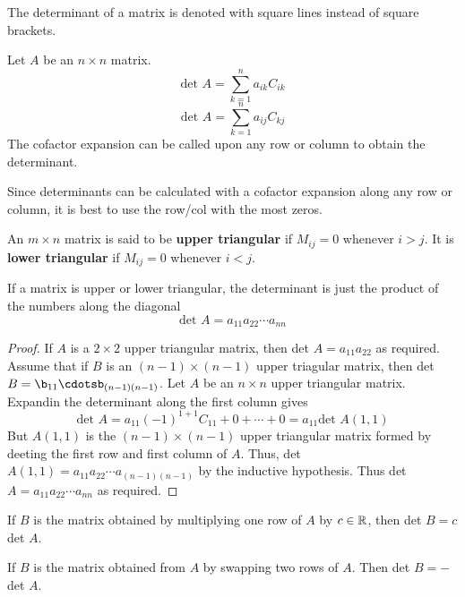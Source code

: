 \documentclass[english, 12pt]{article}
\begin{document}
\begin{note}
The determinant of a matrix is denoted with square lines instead of square brackets.
\end{note}

\begin{thrm}
Let $A$ be an $n \times n$ matrix.
\[\text{det }A = \sum_{k=1}^n a_{ik}C_{ik}\]
\[\text{det }A = \sum_{k=1}^n a_{ij}C_{kj}\]
The cofactor expansion can be called upon any row or column to obtain the determinant.
\end{thrm}

\begin{note}
Since determinants can be calculated with a cofactor expansion along any row or column, it is best to use the row/col with the most zeros.
\end{note}

\begin{defn}
An $m \times n$ matrix is said to be \textbf{upper triangular} if  $M_{ij} = 0$ whenever $i > j$. It is \textbf{lower triangular} if $M_{ij} = 0$ whenever $ i < j$.
\end{defn}

\begin{thrm}
If a matrix is upper or lower triangular, the determinant is just the product of the numbers along the diagonal
\[\text{det }A = a_{11}a_{22}\cdots a_{nn}\]
\begin{proof}
If $A$ is a $2 \times 2$ upper triangular matrix, then det $A=a_{11}a_{22}$ as required. Assume that if $B$ is an $(n-1) \times (n-1)$ upper triagular matrix, then det $B = \b_{11}\cdotsb_{(n-1)(n-1)}$. Let $A$ be an $n \times n$ upper triangular matrix. Expandin the determinant along the first column gives
\[\text{det }A = a_{11}(-1)^{1+1}C_{11} + 0 + \cdots + 0 = a_{11} \text{det }A(1,1)\]
But $A(1,1)$ is the $(n-1) \times (n-1)$ upper triangular matrix formed by deeting the first row and first column of $A$. Thus, det $A(1,1) = a_{11}a_{22}\cdots a_{(n-1)(n-1)}$ by the inductive hypothesis. Thus det $A = a_{11}a_{22}\cdots a_{nn}$ as required.
\end{proof}
\end{thrm}

\begin{thrm}
If $B$ is the matrix obtained by multiplying one row of $A$ by $c \in {\mathbb{R}}$, then det $B = c$ det $A$.
\end{thrm}

\begin{thrm}
If $B$ is the matrix obtained from $A$ by swapping two rows of $A$. Then det $B = -$det $A$.
\end{thrm}
\end{document}
